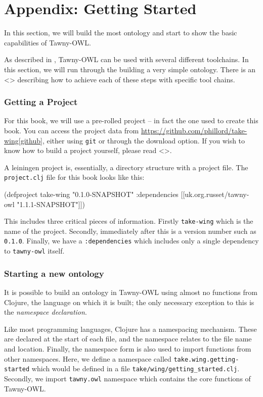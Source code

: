 \chapter{Appendix: Getting Started}

In this section, we will build the most ontology and start to show the
basic capabilities of Tawny-OWL.

As described in \label{/the/environment-the-environment}, Tawny-OWL can be
used with several different toolchains. In this section, we will run
through the building a very simple ontology. There is an <> describing
how to achieve each of these steps with specific tool chains.

\subsection{Getting a Project}
\label{sec-4-1}

For this book, we will use a pre-rolled project -- in fact the one used
to create this book. You can access the project data from
\url{https://github.com/phillord/take-wing[github}], either using \texttt{git} or
through the download option. If you wish to know how to build a project
yourself, please read <>.

A leiningen project is, essentially, a directory structure with a
project file. The \texttt{project.clj} file for this book looks like this:

\begin{clojure}
(defproject take-wing "0.1.0-SNAPSHOT"
  :dependencies [[uk.org.russet/tawny-owl "1.1.1-SNAPSHOT"]])
\end{clojure}

This includes three critical pieces of information. Firstly \texttt{take-wing}
which is the name of the project. Secondly, immediately after this is a
version number such as \texttt{0.1.0}. Finally, we have a \texttt{:dependencies} which
includes only a single dependency to \texttt{tawny-owl} itself.


\subsection{Starting a new ontology}
\label{sec-4-2}

It is possible to build an ontology in Tawny-OWL using almost no
functions from Clojure, the language on which it is built; the only
necessary exception to this is the \emph{namespace declaration}.

Like most programming languages, Clojure has a namespacing mechanism.
These are declared at the start of each file, and the namespace relates
to the file name and location. Finally, the namespace form is also used
to import functions from other namespaces. Here, we define a namespace
called \texttt{take.wing.getting-started} which would be defined in a file
\texttt{take/wing/getting\_started.clj}. Secondly, we import \texttt{tawny.owl}
namespace which contains the core functions of Tawny-OWL.

